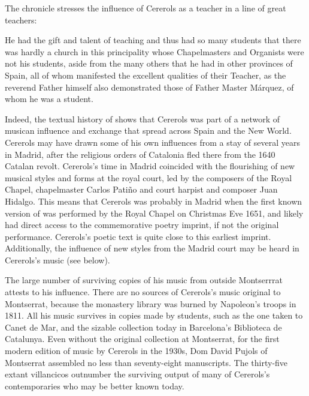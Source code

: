 The chronicle stresses the influence of Cererols as a teacher in a line of great
teachers:
\begin{quoting}
    He had the gift and talent of teaching and thus had so many students that
    there was hardly a church in this principality  whose
    Chapelmasters and Organists were not his students, aside from the many
    others that he had in other provinces of Spain, all of whom manifested the
    excellent qualities of their Teacher, as the reverend Father himself also
    demonstrated those of Father Master Márquez, of whom he  was a
    student.%
    \Autocite
    [7, note 2]
    {Estrada:CererolsBio}
\end{quoting}
Indeed, the textual history of  shows that Cererols
was part of a network of musican influence and exchange that spread across Spain
and the New World. 
Cererols may have drawn some of his own influences from a stay of several years
in Madrid, after the religious orders of Catalonia fled there from the 1640
Catalan revolt.
Cererols's time in Madrid coincided with the flourishing of new musical styles
and forms at the royal court, led by the composers of the Royal Chapel,
chapelmaster Carlos Patiño and court harpist and composer Juan Hidalgo.%
    \Autocites{Stein:Songs}{Rodriguez:Villancico} %
This means that Cererols was probably in Madrid when the first known version of
 was performed by the Royal Chapel on Christmas Eve
1651, and likely had direct access to the commemorative poetry imprint, if not
the original performance.
Cererols's poetic text is quite close to this earliest imprint.
Additionally, the influence of new styles from the Madrid court may be heard in
Cererols's music (see below).

The large number of surviving copies of his music from outside Montserrrat
attests to his influence.
There are no sources of Cererols's music original to Montserrat, because the
monastery library was burned by Napoleon's troops in 1811.%
All his music survives in copies made by students, such as the one taken to
Canet de Mar, and the sizable collection today in Barcelona's Biblioteca de
Catalunya.
Even without the original collection at Montserrat, for the first modern edition
of music by Cererols in the 1930s, Dom David Pujols of Montserrat assembled no
less than seventy-eight manuscripts.%
    \Autocite{Cererols:MEM-VC}
The thirty-five extant villancicos outnumber the surviving output of many of
Cererols's contemporaries who may be better known today.\XXX[who?]

